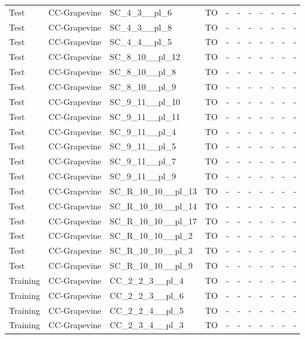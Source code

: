 \documentclass{article}
\begin{document}
\begin{tabular}{lllcccccccc}
Test & CC-Grapevine & SC\_4\_3\_\_pl\_6 & TO & - & - & - & - & - & - & - \\
Test & CC-Grapevine & SC\_4\_3\_\_pl\_8 & TO & - & - & - & - & - & - & - \\
Test & CC-Grapevine & SC\_4\_4\_\_pl\_5 & TO & - & - & - & - & - & - & - \\
Test & CC-Grapevine & SC\_8\_10\_\_pl\_12 & TO & - & - & - & - & - & - & - \\
Test & CC-Grapevine & SC\_8\_10\_\_pl\_8 & TO & - & - & - & - & - & - & - \\
Test & CC-Grapevine & SC\_8\_10\_\_pl\_9 & TO & - & - & - & - & - & - & - \\
Test & CC-Grapevine & SC\_9\_11\_\_pl\_10 & TO & - & - & - & - & - & - & - \\
Test & CC-Grapevine & SC\_9\_11\_\_pl\_11 & TO & - & - & - & - & - & - & - \\
Test & CC-Grapevine & SC\_9\_11\_\_pl\_4 & TO & - & - & - & - & - & - & - \\
Test & CC-Grapevine & SC\_9\_11\_\_pl\_5 & TO & - & - & - & - & - & - & - \\
Test & CC-Grapevine & SC\_9\_11\_\_pl\_7 & TO & - & - & - & - & - & - & - \\
Test & CC-Grapevine & SC\_9\_11\_\_pl\_9 & TO & - & - & - & - & - & - & - \\
Test & CC-Grapevine & SC\_R\_10\_10\_\_pl\_13 & TO & - & - & - & - & - & - & - \\
Test & CC-Grapevine & SC\_R\_10\_10\_\_pl\_14 & TO & - & - & - & - & - & - & - \\
Test & CC-Grapevine & SC\_R\_10\_10\_\_pl\_17 & TO & - & - & - & - & - & - & - \\
Test & CC-Grapevine & SC\_R\_10\_10\_\_pl\_2 & TO & - & - & - & - & - & - & - \\
Test & CC-Grapevine & SC\_R\_10\_10\_\_pl\_3 & TO & - & - & - & - & - & - & - \\
Test & CC-Grapevine & SC\_R\_10\_10\_\_pl\_9 & TO & - & - & - & - & - & - & - \\
Training & CC-Grapevine & CC\_2\_2\_3\_\_pl\_4 & TO & - & - & - & - & - & - & - \\
Training & CC-Grapevine & CC\_2\_2\_3\_\_pl\_6 & TO & - & - & - & - & - & - & - \\
Training & CC-Grapevine & CC\_2\_2\_4\_\_pl\_5 & TO & - & - & - & - & - & - & - \\
Training & CC-Grapevine & CC\_2\_3\_4\_\_pl\_3 & TO & - & - & - & - & - & - & - \\

\end{tabular}
\end{document}
